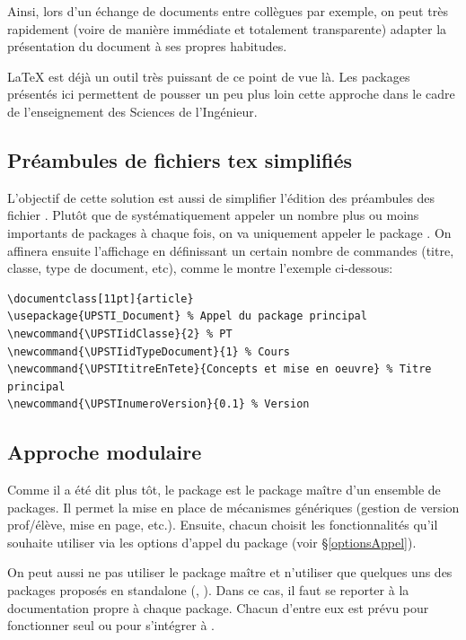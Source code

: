 \documentclass[11pt]{article}
\newcommand{\UPSTIidClasse}{0}
\newcommand{\UPSTIidTypeDocument}{0}
\newcommand{\UPSTItitreEnTete}{Concepts et mise en œuvre}
\newcommand{\UPSTInumeroVersion}{1.1}
\begin{document}
Ainsi, lors d'un échange de documents entre collègues par exemple, on peut très rapidement (voire de manière immédiate et totalement transparente) adapter la présentation du document à ses propres habitudes.

\LaTeX{} est déjà un outil très puissant de ce point de vue là. Les packages présentés ici permettent de pousser un peu plus loin cette approche dans le cadre de l'enseignement des Sciences de l'Ingénieur.

\subsection{Préambules de fichiers tex simplifiés}
L'objectif de cette solution est aussi de simplifier l'édition des préambules des fichier . Plutôt que de systématiquement appeler un nombre plus ou moins importants de packages à chaque fois, on va uniquement appeler le package . On affinera ensuite l'affichage en définissant un certain nombre de commandes (titre, classe, type de document, etc), comme le montre l'exemple ci-dessous:

\lstset{language=Tex}
\begin{lstlisting}
\documentclass[11pt]{article}
\usepackage{UPSTI_Document} % Appel du package principal
\newcommand{\UPSTIidClasse}{2} % PT
\newcommand{\UPSTIidTypeDocument}{1} % Cours
\newcommand{\UPSTItitreEnTete}{Concepts et mise en oeuvre} % Titre principal     
\newcommand{\UPSTInumeroVersion}{0.1} % Version
\end{lstlisting}


\subsection{Approche modulaire}
Comme il a été dit plus tôt, le package  est le package \og maître\fg{} d'un ensemble de packages. Il permet la mise en place de mécanismes génériques (gestion de version prof/élève, mise en page, etc.). Ensuite, chacun choisit les fonctionnalités qu'il souhaite utiliser via les options d'appel du package (voir \S \ref{optionsAppel}).

On peut aussi ne pas utiliser le package \og maître\fg{} et n'utiliser que quelques uns des packages proposés en standalone (, ). Dans ce cas, il faut se reporter à la documentation propre à chaque package. Chacun d'entre eux est prévu pour fonctionner seul ou pour s'intégrer à .
\end{document}
